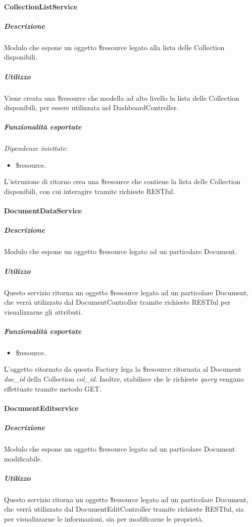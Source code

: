 \paragraph{CollectionListService}
\subparagraph{Descrizione}
Modulo che espone un oggetto \$resource legato alla lista delle Collection disponibili. 

\subparagraph{Utilizzo}
Viene creata una \$resource che modella ad alto livello la lista delle Collection disponibili,
per essere utilizzata nel DashboardController.

\subparagraph{Funzionalità esportate}
\emph{Dipendenze iniettate:}
\begin{itemize}
 \item \$resource.
\end{itemize}
L'istruzione di ritorno crea una \$resource che contiene la lista delle Collection disponibili, con 
cui interagire tramite richieste RESTful.

\paragraph{DocumentDataService}
\subparagraph{Descrizione}
Modulo che espone un oggetto \$resource legato ad un particolare Document.

\subparagraph{Utilizzo}
Questo servizio ritorna un oggetto \$resource legato ad un particolare Document, che verrà
utilizzato dal DocumentController tramite richieste RESTful per visualizzarne gli attributi.

\subparagraph{Funzionalità esportate}
\begin{itemize}
 \item \$resource.
\end{itemize}
L'oggetto ritornato da questa Factory lega la \$resource ritornata al Document \emph{doc_id} della Collection
\emph{col_id}. Inoltre, stabilisce che le richieste \emph{query} vengano effettuate tramite metodo GET. 

\paragraph{DocumentEditservice}
\subparagraph{Descrizione}
Modulo che espone un oggetto \$resource legato ad un particolare Document modificabile.

\subparagraph{Utilizzo}
Questo servizio ritorna un oggetto \$resource legato ad un particolare Document, che verrà
utilizzato dal DocumentEditController tramite richieste RESTful, sia per visualizzarne
le informazioni, sia per modificarne le proprietà.


